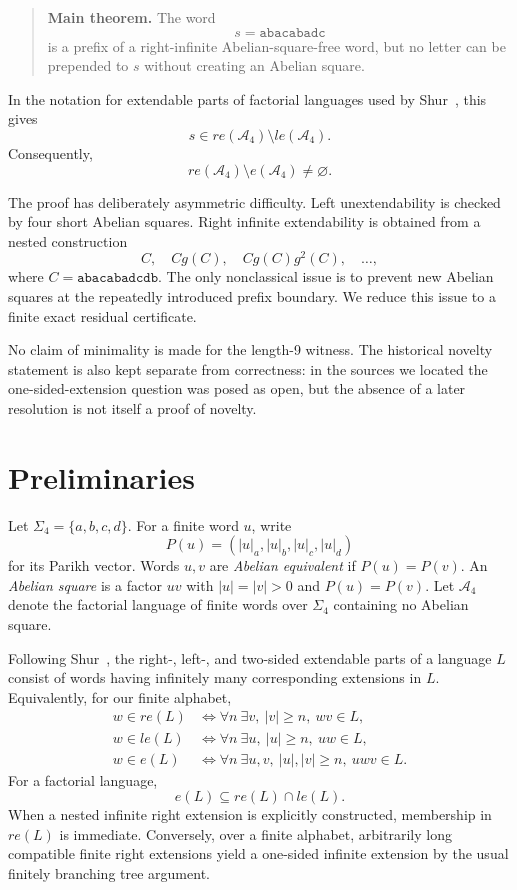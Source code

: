 \documentclass[11pt]{article}
\theoremstyle{definition}
\newcommand{\A}{\mathcal A_4}
\newcommand{\Par}{P}
\newcommand{\code}[1]{\texttt{#1}}
\begin{document}
\begin{quote}
\textbf{Main theorem.} The word
\[
s=\code{abacabadc}
\]
is a prefix of a right-infinite Abelian-square-free word, but no letter can be prepended to $s$ without creating an Abelian square.
\end{quote}

In the notation for extendable parts of factorial languages used by Shur~\cite{Shur2008}, this gives
\[
\boxed{s\in re(\A)\setminus le(\A)}.
\]
Consequently,
\[
\boxed{re(\A)\setminus e(\A)\neq\varnothing}.
\]

The proof has deliberately asymmetric difficulty. Left unextendability is checked by four short Abelian squares. Right infinite extendability is obtained from a nested construction
\[
C,\quad Cg(C),\quad Cg(C)g^2(C),\quad\ldots,
\]
where $C=\code{abacabadcdb}$. The only nonclassical issue is to prevent new Abelian squares at the repeatedly introduced prefix boundary. We reduce this issue to a finite exact residual certificate.

No claim of minimality is made for the length-9 witness. The historical novelty statement is also kept separate from correctness: in the sources we located the one-sided-extension question was posed as open, but the absence of a later resolution is not itself a proof of novelty.

\section{Preliminaries}

Let $\Sigma_4=\{a,b,c,d\}$. For a finite word $u$, write
\[
\Par(u)=(|u|_a,|u|_b,|u|_c,|u|_d)
\]
for its Parikh vector. Words $u,v$ are \emph{Abelian equivalent} if $\Par(u)=\Par(v)$. An \emph{Abelian square} is a factor $uv$ with $|u|=|v|>0$ and $\Par(u)=\Par(v)$. Let $\A$ denote the factorial language of finite words over $\Sigma_4$ containing no Abelian square.

Following Shur~\cite{Shur2008}, the right-, left-, and two-sided extendable parts of a language $L$ consist of words having infinitely many corresponding extensions in $L$. Equivalently, for our finite alphabet,
\begin{align*}
w\in re(L)&\iff \forall n\ \exists v,\ |v|\ge n,\ wv\in L,\\
w\in le(L)&\iff \forall n\ \exists u,\ |u|\ge n,\ uw\in L,\\
w\in e(L)&\iff \forall n\ \exists u,v,\ |u|,|v|\ge n,\ uwv\in L.
\end{align*}
For a factorial language,
\[
e(L)\subseteq re(L)\cap le(L).
\]
When a nested infinite right extension is explicitly constructed, membership in $re(L)$ is immediate. Conversely, over a finite alphabet, arbitrarily long compatible finite right extensions yield a one-sided infinite extension by the usual finitely branching tree argument.
\end{document}
